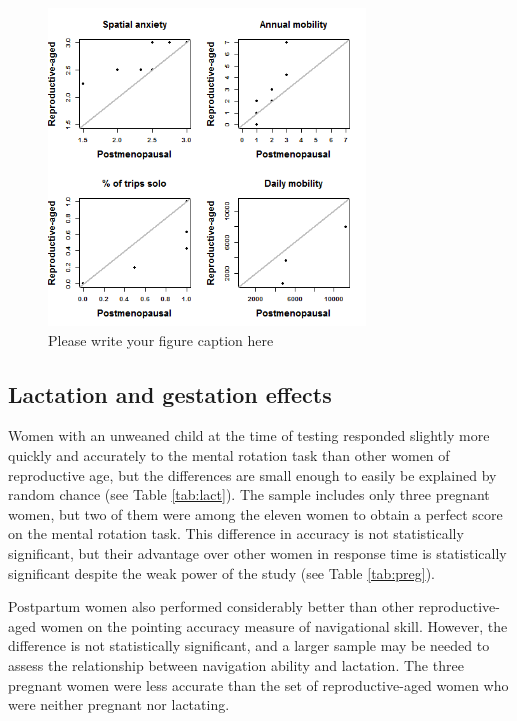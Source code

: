 \begin{figure}[!htb]
  \includegraphics[width=0.75\textwidth]{QQ_pst}
\caption{Please write your figure caption here}
\label{fig:meno}       %
\end{figure}


	\subsection{Lactation and gestation effects}
	\label{sec:3.3}
	
Women with an unweaned child at the time of testing responded slightly more quickly and accurately to the mental rotation task than other women of reproductive age, but the differences are small enough to easily be explained by random chance (see Table \ref{tab:lact}).  The sample includes only three pregnant women, but two of them were among the eleven women to obtain a perfect score on the mental rotation task.  This difference in accuracy is not statistically significant, but their advantage over other women in response time is statistically significant despite the weak power of the study (see Table \ref{tab:preg}).  

Postpartum women also performed considerably better than other reproductive-aged women on the pointing accuracy measure of navigational skill.  However, the difference is not statistically significant, and a larger sample may be needed to assess the relationship between navigation ability and lactation.  The three pregnant women were less accurate than the set of reproductive-aged women who were neither pregnant nor lactating. 

